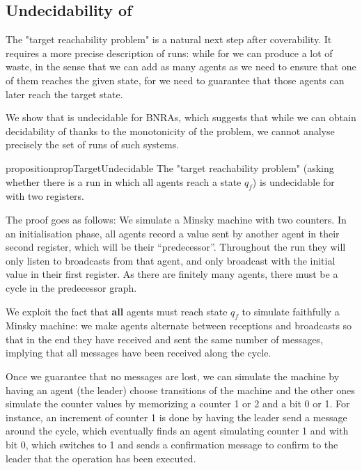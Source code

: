 \subsection{Undecidability of \Target}
\label{sec:undec-target}

The "target reachability problem" is a natural next step after coverability. 
It requires a more precise description of runs: while for \COVER we can produce a lot of waste, in the sense that we can add as many agents as we need to ensure that one of them reaches the given state, for \Target we need to guarantee that those agents can later reach the target state.

We show that \Target is undecidable for BNRAs, which suggests that while we can obtain decidability of \COVER thanks to the monotonicity of the problem, we cannot analyse precisely the set of runs of such systems.


\begin{restatable}{proposition}{propTargetUndecidable}
\label{prop:target-undec}
	The "target reachability problem" (asking whether there is a run in which all agents reach a state $q_f$) is undecidable for \BNRA with two registers.
\end{restatable}

The proof goes as follows: We simulate a Minsky machine with two counters. In an initialisation phase, all agents record a value  sent by another agent in their second register, which will be their ``predecessor''. Throughout the run they will only listen to broadcasts from that agent, and only broadcast with the initial value in their first register. As there are finitely many agents, there must be a cycle in the predecessor graph.

We exploit the fact that \textbf{all} agents must reach state $q_f$ to simulate faithfully a Minsky machine: we make agents alternate between receptions and broadcasts so that in the end they have received and sent the same number of messages, implying that all messages have been received along the cycle.

Once we guarantee that no messages are lost, we can simulate the machine by having an agent (the leader) choose transitions of the machine and the other ones simulate the counter values by memorizing a counter 1 or 2 and a bit 0 or 1. For instance, an increment of counter 1 is done by having the leader send a message around the cycle, which eventually finds an agent simulating counter 1 and with bit 0, which switches to 1 and sends a confirmation message to confirm to the leader that the operation has been executed.